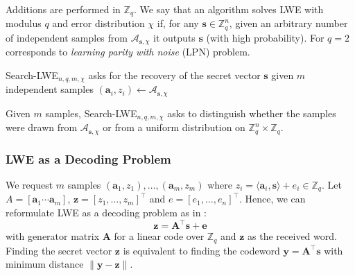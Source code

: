 \documentclass[
  a4paper,  %
  twoside,  %
  bibliography=totoc,
  headsepline,
  cleardoublepage=empty,
  parskip=half,
  draft=false
]{scrbook}
\begin{document}
Additions are performed in $\mathbb{Z}_q$. We say that an algorithm solves LWE with modulus $q$ and error distribution $\chi$ if, for any $\mathbf{s} \in \mathbb{Z}_q^n$, given an arbitrary number of independent samples from $\mathcal{A}_{\mathbf{s}, \chi}$ it outputs $\mathbf{s}$ (with high probability). For $q=2$ corresponds to \textit{learning parity with noise} (LPN) problem. %

\begin{definition} %
  Search-LWE$_{n, q, m, \chi}$ asks for the recovery of the secret vector $\mathbf{s}$ given $m$ independent samples $(\mathbf{a}_i, z_i) \leftarrow \mathcal{A}_{\mathbf{s}, \chi}$ %
\end{definition}

\begin{definition}
  Given $m$ samples, Search-LWE$_{n, q, m, \chi}$ asks to distinguish whether the samples were drawn from  $\mathcal{A}_{\mathbf{s}, \chi}$ or from a uniform distribution on $\mathbb{Z}_q^n \times \mathbb{Z}_q$.
\end{definition}

\subsubsection{LWE as a Decoding Problem} \label{sec:lwe-decoding}
We request $m$ samples $(\mathbf{a}_1, z_1), \ldots, (\mathbf{a}_m, z_m)$ where $z_i = \langle \mathbf{a}_i, \mathbf{s} \rangle + e_i \in \mathbb{Z}_q$. Let $A = \left[ \mathbf{a}_1 \cdots \mathbf{a}_m\right]$, $\mathbf{z} = \left[z_1, \ldots, z_m\right]^\intercal$ and $e = \left[e_1, \ldots, e_n\right]^\intercal$. Hence, we can reformulate LWE as a decoding problem as in \cite{GJS15}:
\begin{equation} \label{eq:lwe-decoding}
  \mathbf{z} =  \mathbf{A}^\intercal \mathbf{s} + \mathbf{e}
\end{equation} %
with generator matrix $\mathbf{A}$ for a linear code over $\mathbb{Z}_q$ and $\mathbf{z}$ as the received word. Finding the secret vector $\mathbf{z}$ is equivalent to finding the codeword $\mathbf{y} = \mathbf{A}^\intercal\mathbf{s}$ with minimum distance $\| \mathbf{y} - \mathbf{z} \|$.
\end{document}
